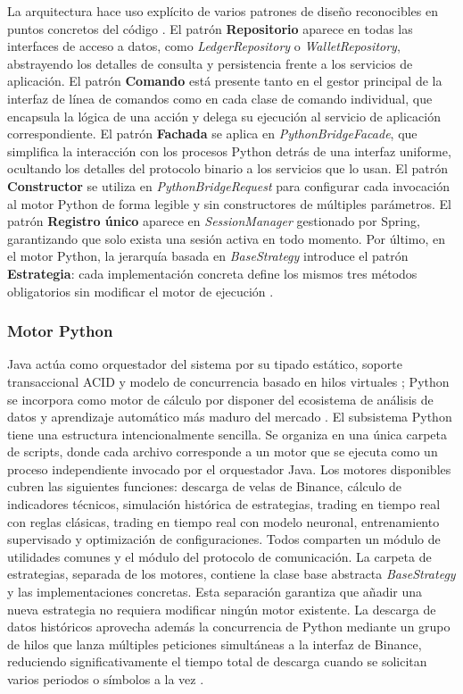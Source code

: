 La arquitectura hace uso explícito de varios patrones de diseño reconocibles en puntos concretos del código \parencite{gamma_design_1994,fowler_patterns_2002}. El patrón \textbf{Repositorio} aparece en todas las interfaces de acceso a datos, como \textit{LedgerRepository} o \textit{WalletRepository}, abstrayendo los detalles de consulta y persistencia frente a los servicios de aplicación. El patrón \textbf{Comando} está presente tanto en el gestor principal de la interfaz de línea de comandos como en cada clase de comando individual, que encapsula la lógica de una acción y delega su ejecución al servicio de aplicación correspondiente. El patrón \textbf{Fachada} se aplica en \textit{PythonBridgeFacade}, que simplifica la interacción con los procesos Python detrás de una interfaz uniforme, ocultando los detalles del protocolo binario a los servicios que lo usan. El patrón \textbf{Constructor} se utiliza en \textit{PythonBridgeRequest} para configurar cada invocación al motor Python de forma legible y sin constructores de múltiples parámetros. El patrón \textbf{Registro único} aparece en \textit{SessionManager} gestionado por Spring, garantizando que solo exista una sesión activa en todo momento. Por último, en el motor Python, la jerarquía basada en \textit{BaseStrategy} introduce el patrón \textbf{Estrategia}: cada implementación concreta define los mismos tres métodos obligatorios sin modificar el motor de ejecución \parencite{gamma_design_1994}.

\subsubsection{Motor Python}

Java actúa como orquestador del sistema por su tipado estático, soporte transaccional ACID y modelo de concurrencia basado en hilos virtuales \parencite{goetz_java_concurrency_2006}; Python se incorpora como motor de cálculo por disponer del ecosistema de análisis de datos y aprendizaje automático más maduro del mercado \parencite{hilpisch_python_2018,goodfellow_deep_2016}. El subsistema Python tiene una estructura intencionalmente sencilla. Se organiza en una única carpeta de scripts, donde cada archivo corresponde a un motor que se ejecuta como un proceso independiente invocado por el orquestador Java. Los motores disponibles cubren las siguientes funciones: descarga de velas de Binance, cálculo de indicadores técnicos, simulación histórica de estrategias, trading en tiempo real con reglas clásicas, trading en tiempo real con modelo neuronal, entrenamiento supervisado y optimización de configuraciones. Todos comparten un módulo de utilidades comunes y el módulo del protocolo de comunicación. La carpeta de estrategias, separada de los motores, contiene la clase base abstracta \textit{BaseStrategy} y las implementaciones concretas. Esta separación garantiza que añadir una nueva estrategia no requiera modificar ningún motor existente. La descarga de datos históricos aprovecha además la concurrencia de Python mediante un grupo de hilos que lanza múltiples peticiones simultáneas a la interfaz de Binance, reduciendo significativamente el tiempo total de descarga cuando se solicitan varios periodos o símbolos a la vez \parencite{python_concurrent_futures_2024,binance_rest_api_2024}.

